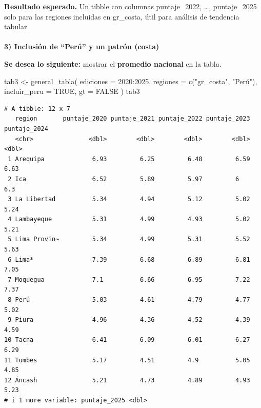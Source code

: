 \documentclass[
  11pt,
  letterpaper,
  DIV=11,
  numbers=noendperiod]{scrartcl}
\makeatletter
\let\oldparagraph\paragraph
\renewcommand{\paragraph}{
    \@ifstar
      \xxxParagraphStar
      \xxxParagraphNoStar
  }
\newcommand{\xxxParagraphStar}[1]{\oldparagraph*{#1}\mbox{}}
\newcommand{\xxxParagraphNoStar}[1]{\oldparagraph{#1}\mbox{}}
\newenvironment{Shaded}{\begin{snugshade}}{\end{snugshade}}
\newcommand{\AttributeTok}[1]{\textcolor[rgb]{0.40,0.45,0.13}{#1}}
\newcommand{\ConstantTok}[1]{\textcolor[rgb]{0.56,0.35,0.01}{#1}}
\newcommand{\DecValTok}[1]{\textcolor[rgb]{0.68,0.00,0.00}{#1}}
\newcommand{\FunctionTok}[1]{\textcolor[rgb]{0.28,0.35,0.67}{#1}}
\newcommand{\NormalTok}[1]{\textcolor[rgb]{0.00,0.23,0.31}{#1}}
\newcommand{\OtherTok}[1]{\textcolor[rgb]{0.00,0.23,0.31}{#1}}
\newcommand{\SpecialCharTok}[1]{\textcolor[rgb]{0.37,0.37,0.37}{#1}}
\newcommand{\StringTok}[1]{\textcolor[rgb]{0.13,0.47,0.30}{#1}}
\makeatother
\begin{document}
\textbf{Resultado esperado.} Un tibble con columnas puntaje\_2022,
\ldots, puntaje\_2025 solo para las regiones incluidas en gr\_costa,
útil para análisis de tendencia tabular.

\paragraph{\texorpdfstring{\textbf{3) Inclusión de ``Perú'' y un patrón
(costa)}}{3) Inclusión de ``Perú'' y un patrón (costa)}}\label{inclusiuxf3n-de-peruxfa-y-un-patruxf3n-costa}

\textbf{Se desea lo siguiente:} mostrar el \textbf{promedio nacional} en
la tabla.

\begin{Shaded}
\begin{Highlighting}[]
\NormalTok{tab3 }\OtherTok{\textless{}{-}} \FunctionTok{general\_tabla}\NormalTok{(}
  \AttributeTok{ediciones    =} \DecValTok{2020}\SpecialCharTok{:}\DecValTok{2025}\NormalTok{,}
  \AttributeTok{regiones     =} \FunctionTok{c}\NormalTok{(}\StringTok{"gr\_costa"}\NormalTok{, }\StringTok{"Perú"}\NormalTok{),}
  \AttributeTok{incluir\_peru =} \ConstantTok{TRUE}\NormalTok{,}
  \AttributeTok{gt           =} \ConstantTok{FALSE}
\NormalTok{)}
\NormalTok{tab3}
\end{Highlighting}
\end{Shaded}

\begin{verbatim}
# A tibble: 12 x 7
   region       puntaje_2020 puntaje_2021 puntaje_2022 puntaje_2023 puntaje_2024
   <chr>               <dbl>        <dbl>        <dbl>        <dbl>        <dbl>
 1 Arequipa             6.93         6.25         6.48         6.59         6.63
 2 Ica                  6.52         5.89         5.97         6            6.3 
 3 La Libertad          5.34         4.94         5.12         5.02         5.24
 4 Lambayeque           5.31         4.99         4.93         5.02         5.21
 5 Lima Provin~         5.34         4.99         5.31         5.52         5.63
 6 Lima*                7.39         6.68         6.89         6.81         7.05
 7 Moquegua             7.1          6.66         6.95         7.22         7.37
 8 Perú                 5.03         4.61         4.79         4.77         5.02
 9 Piura                4.96         4.36         4.52         4.39         4.59
10 Tacna                6.41         6.09         6.01         6.27         6.29
11 Tumbes               5.17         4.51         4.9          5.05         4.85
12 Áncash               5.21         4.73         4.89         4.93         5.23
# i 1 more variable: puntaje_2025 <dbl>
\end{verbatim}
\end{document}
